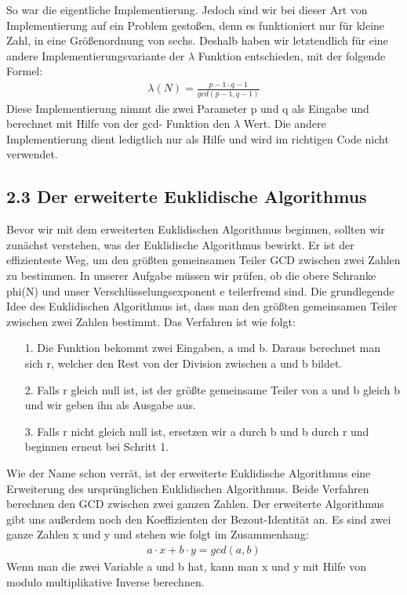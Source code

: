 \documentclass[course=asp]{aspdoc}
\begin{document}
So war die eigentliche Implementierung. Jedoch sind wir bei dieser Art von Implementierung auf ein Problem gestoßen, denn es funktioniert nur für kleine Zahl, in eine Größenordnung von sechs. Deshalb haben wir letztendlich für eine andere Implementierungsvariante der $\lambda $ Funktion entschieden, mit der folgende Formel:
\begin{align}
	\lambda(N) = \frac{{p-1}\cdot{q-1}}{gcd(p-1, q-1)}
\end{align} 
Diese Implementierung nimmt die zwei Parameter p und q als Eingabe und berechnet mit Hilfe von der gcd- Funktion den $\lambda $ Wert. Die andere Implementierung dient ledigtlich nur als Hilfe und wird im richtigen Code nicht verwendet.
\subsection*{2.3 Der erweiterte Euklidische Algorithmus}
Bevor wir mit dem erweiterten Euklidischen Algorithmus beginnen, sollten wir zunächst verstehen, was der Euklidische Algorithmus bewirkt. Er ist der effizienteste Weg, um den größten gemeinsamen Teiler GCD zwischen zwei Zahlen zu bestimmen. In unserer Aufgabe müssen wir prüfen, ob die obere Schranke phi(N) und unser Verschlüsselungsexponent e teilerfremd sind. Die grundlegende Idee des Euklidischen Algorithmus ist, dass man den größten gemeinsamen Teiler zwischen zwei Zahlen bestimmt. Das Verfahren ist wie folgt:
\begin{itemize}
 \item [1.] Die Funktion bekommt zwei Eingaben, a und b. Daraus berechnet man sich r, welcher den Rest von der Division zwischen a und b bildet.
 \item [2.] Falls r gleich null ist, ist der größte gemeinsame Teiler von a und b gleich b und wir geben ihn als Ausgabe aus.
 \item [3.] Falls r nicht gleich null ist, ersetzen wir a durch b und b durch r und beginnen erneut bei Schritt 1. 
\end{itemize}
Wie der Name schon verrät, ist der erweiterte Euklidische Algorithmus eine Erweiterung des ursprünglichen Euklidischen Algorithmus. Beide Verfahren berechnen den GCD zwischen zwei ganzen Zahlen. Der erweiterte Algorithmus gibt uns außerdem noch den Koeffizienten der Bezout-Identität an. Es sind zwei ganze Zahlen x und y und stehen wie folgt im Zusammenhang:
\begin{align}
	a\cdot x + b\cdot y = gcd(a, b)
\end{align} 
Wenn man die zwei Variable a und b hat, kann man x und y mit Hilfe von modulo multiplikative Inverse berechnen.
\end{document}
